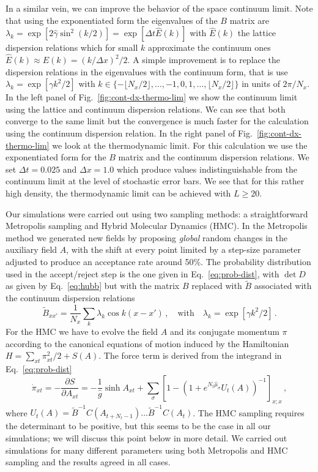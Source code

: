 \documentclass[aps,eqsecnum,amsmath,onecolumn,groupedaddress,superscriptaddress,notitlepage,nofootinbib]{revtex4-1}
\newcommand{\beq}{\begin{equation}}
\newcommand{\eeq}{\end{equation}}
\def\pd#1#2{\frac{\partial #1}{\partial #2}}
\begin{document}
In a similar vein, we can improve the behavior of the space continuum limit. Note that
using the exponentiated form the eigenvalues of the $B$ matrix are 
$\lambda_k=\exp[2\hat\gamma \sin^2(k/2)]=\exp[\Delta t \hat E(k)]$ with
$\hat E(k)$ the lattice dispersion relations which for small $k$ approximate the
continuum ones $\hat E(k)\approx E(k) = (k/\Delta x)^2/2$. A simple improvement
is to replace the dispersion relations in the eigenvalues with the continuum form,
that is use $\lambda_k=\exp[\gamma k^2/2]$ with $k\in\{-\lfloor N_x/2\rfloor,
 \ldots,-1,0,1,\ldots, \lfloor N_x/2\rfloor \}$
in units of $2\pi/N_x$. In the left panel of Fig.~\ref{fig:cont-dx-thermo-lim} we show the 
continuum limit
using the lattice and continuum dispersion relations. We can see that both converge to
the same limit but the convergence is much faster for the calculation using the
continuum dispersion relation. In the right panel of Fig.~\ref{fig:cont-dx-thermo-lim} we
look at the thermodynamic limit. For this calculation we use the exponentiated form for the
$B$ matrix and the continuum dispersion relations. We set $\Delta t=0.025$ and
$\Delta x=1.0$ which produce values indistinguishable from the continuum limit at the
level of stochastic error bars. We see that for this rather high density, the thermodynamic
limit can be achieved with $L\geq 20$. 
 
Our simulations were carried out using two sampling methods: a straightforward Metropolis 
sampling and Hybrid Molecular Dynamics (HMC). In the Metropolis method we generated new fields by
proposing {\em global} random changes in the auxiliary field $A$, with the shift at every point
limited by a step-size parameter adjusted to produce an acceptance rate around 50\%.
The probability distribution used in the accept/reject step is the one given in 
Eq.~\ref{eq:prob-dist}, with $\det D$ as given by Eq.~\ref{eq:hubb} but with the
matrix $B$ replaced with $\tilde B$ associated with the continuum dispersion relations
\beq
{\tilde B}_{xx'} = \frac1{N_x}\sum_{k} {\lambda_k} \cos{k(x-x')} \,, \quad\text{with}\quad
\lambda_k=\exp[\gamma k^2/2] \,.
\eeq
For the HMC we have to evolve the field $A$ and its conjugate momentum $\pi$ according
to the canonical equations of motion induced by the Hamiltonian $H=\sum_{xt} \pi_{xt}^2/2+S(A)$.
The force term is derived from the integrand in Eq.~\ref{eq:prob-dist}
\beq
\dot\pi_{xt} = -\pd{S}{A_{xt}} =  -\frac1{\hat g}\sinh A_{xt} +
 \sum_\sigma [1-(1+e^{N_t \hat\mu_\sigma} U_t(A))^{-1}]_{x;x} \,,
\eeq
where $U_t(A) = {\tilde B}^{-1}C(A_{t+N_t-1})...{\tilde B}^{-1}C(A_{t})$. The HMC sampling
requires the determinant to be positive, but this seems to be the case in all our simulations;
we will discuss this point below in more detail. We carried out simulations for many different
parameters using both Metropolis and HMC sampling and the results agreed in all cases.
\end{document}
